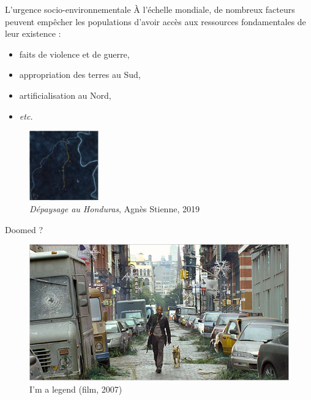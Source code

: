\documentclass[newPxFont]{beamer}
\begin{document}
\begin{frame}[c]{L'urgence socio-environnementale}
\vspace{-1cm}
À l'échelle mondiale, de nombreux facteurs peuvent empêcher les populations d'avoir accès aux ressources fondamentales de leur existence :
\begin{itemize}
  \item faits de violence et de guerre,
  \item appropriation des terres au Sud,
  \item artificialisation au Nord,
  \item \textit{etc.}
\end{itemize}
\begin{figure}
  \includegraphics[height=3cm]{img/Honduras.jpg}
  \caption{\textit{Dépaysage au Honduras}, Agnès Stienne, 2019}
\end{figure}
\end{frame}

\begin{frame}[c]{Doomed ?}
\vspace{-1cm}

\begin{figure}
  \includegraphics[width=\textwidth]{img/im_legend-600.jpg}
  \caption{I'm a legend (film, 2007)}
\end{figure}
\end{frame}
\end{document}
